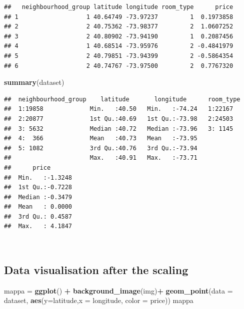 \documentclass[
]{article}
\newenvironment{Shaded}{\begin{snugshade}}{\end{snugshade}}
\newcommand{\DataTypeTok}[1]{\textcolor[rgb]{0.13,0.29,0.53}{#1}}
\newcommand{\KeywordTok}[1]{\textcolor[rgb]{0.13,0.29,0.53}{\textbf{#1}}}
\newcommand{\NormalTok}[1]{#1}
\newcommand{\OperatorTok}[1]{\textcolor[rgb]{0.81,0.36,0.00}{\textbf{#1}}}
\newcommand{\StringTok}[1]{\textcolor[rgb]{0.31,0.60,0.02}{#1}}
\begin{document}
\begin{verbatim}
##   neighbourhood_group latitude longitude room_type      price
## 1                   1 40.64749 -73.97237         1  0.1973858
## 2                   2 40.75362 -73.98377         2  1.0607252
## 3                   2 40.80902 -73.94190         1  0.2087456
## 4                   1 40.68514 -73.95976         2 -0.4841979
## 5                   2 40.79851 -73.94399         2 -0.5864354
## 6                   2 40.74767 -73.97500         2  0.7767320
\end{verbatim}

\begin{Shaded}
\begin{Highlighting}[]
\KeywordTok{summary}\NormalTok{(dataset)}
\end{Highlighting}
\end{Shaded}

\begin{verbatim}
##  neighbourhood_group    latitude       longitude      room_type
##  1:19858             Min.   :40.50   Min.   :-74.24   1:22167  
##  2:20877             1st Qu.:40.69   1st Qu.:-73.98   2:24503  
##  3: 5632             Median :40.72   Median :-73.96   3: 1145  
##  4:  366             Mean   :40.73   Mean   :-73.95            
##  5: 1082             3rd Qu.:40.76   3rd Qu.:-73.94            
##                      Max.   :40.91   Max.   :-73.71            
##      price        
##  Min.   :-1.3248  
##  1st Qu.:-0.7228  
##  Median :-0.3479  
##  Mean   : 0.0000  
##  3rd Qu.: 0.4587  
##  Max.   : 4.1847
\end{verbatim}

~\\

\hypertarget{data-visualisation-after-the-scaling}{%
\subsection{Data visualisation after the
scaling}\label{data-visualisation-after-the-scaling}}

\begin{Shaded}
\begin{Highlighting}[]
\NormalTok{mappa =}\StringTok{ }\KeywordTok{ggplot}\NormalTok{() }\OperatorTok{+}\StringTok{ }\KeywordTok{background_image}\NormalTok{(img)}\OperatorTok{+}\StringTok{ }\KeywordTok{geom_point}\NormalTok{(}\DataTypeTok{data =}\NormalTok{ dataset,  }\KeywordTok{aes}\NormalTok{(}\DataTypeTok{y=}\NormalTok{latitude,}\DataTypeTok{x =}\NormalTok{ longitude, }\DataTypeTok{color =}\NormalTok{ price)) }
\NormalTok{mappa}
\end{Highlighting}
\end{Shaded}
\end{document}
